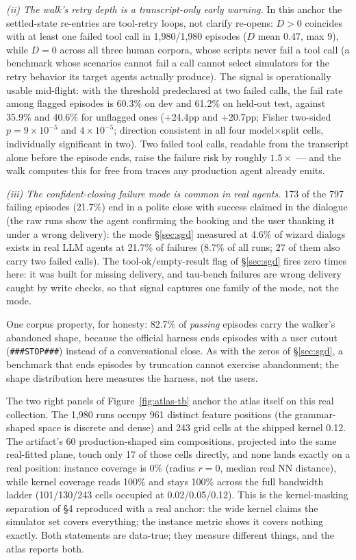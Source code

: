 \emph{(ii) The walk's retry depth is a transcript-only early warning.} In this anchor the
settled-state re-entries are tool-retry loops, not clarify re-opens: $D>0$ coincides with
at least one failed tool call in 1{,}980/1{,}980 episodes ($D$ mean 0.47, max 9), while
$D=0$ across all three human corpora, whose scripts never fail a tool call (a benchmark
whose scenarios cannot fail a call cannot select simulators for the retry behavior its
target agents actually produce). The signal is operationally usable mid-flight: with the
threshold predeclared at two failed calls, the fail rate among flagged episodes is
60.3\% on dev and 61.2\% on held-out test, against 35.9\% and 40.6\% for unflagged ones
(+24.4pp and +20.7pp; Fisher two-sided $p=9\times10^{-5}$ and $4\times10^{-5}$;
direction consistent in all four model$\times$split cells, individually significant in
two). Two failed tool calls, readable from the transcript alone before the episode ends,
raise the failure risk by roughly $1.5\times$ --- and the walk computes this for free from
traces any production agent already emits.

\emph{(iii) The confident-closing failure mode is common in real agents.} 173 of the 797
failing episodes (21.7\%) end in a polite close with success claimed in the dialogue
(the raw runs show the agent confirming the booking and the user thanking it under a
wrong delivery): the mode \S\ref{sec:sgd} measured at 4.6\% of wizard dialogs exists in
real LLM agents at 21.7\% of failures (8.7\% of all runs; 27 of them also carry two
failed calls). The tool-ok/empty-result flag of \S\ref{sec:sgd} fires zero times here:
it was built for missing delivery, and tau-bench failures are wrong delivery caught by
write checks, so that signal captures one family of the mode, not the mode.

One corpus property, for honesty: 82.7\% of \emph{passing} episodes carry the walker's
abandoned shape, because the official harness ends episodes with a user cutout
(\texttt{\#\#\#STOP\#\#\#}) instead of a conversational close. As with the zeros of
\S\ref{sec:sgd}, a benchmark that ends episodes by truncation cannot exercise
abandonment; the shape distribution here measures the harness, not the users.

The two right panels of Figure~\ref{fig:atlas-tb} anchor the atlas itself on this real
collection.
The 1{,}980 runs occupy 961 distinct feature positions (the grammar-shaped space is discrete
and dense) and 243 grid cells at the shipped kernel 0.12.
The artifact's 60 production-shaped sim compositions, projected into the same
real-fitted plane, touch only 17 of those cells directly, and none lands exactly on a real
position: instance coverage is 0\% (radius $r=0$, median real NN distance), while kernel
coverage reads 100\% and stays 100\% across the full bandwidth ladder (101/130/243 cells
occupied at 0.02/0.05/0.12).
This is the kernel-masking separation of \S4 reproduced with a real anchor: the wide kernel
claims the simulator set covers everything; the instance metric shows it covers nothing
exactly.
Both statements are data-true; they measure different things, and the atlas reports both.

